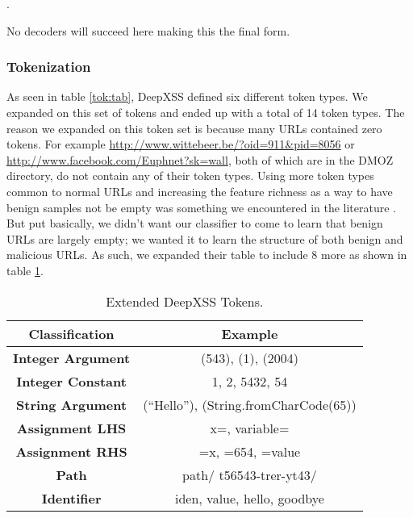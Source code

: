 . 

No decoders will succeed here making this the final form.


\subsubsection{Tokenization}
As seen in table \ref{tok:tab}, DeepXSS defined six different token types. We expanded on this set of tokens and ended up with a total of 14 token types. The reason we expanded on this token set is because many URLs contained zero tokens. For example \url{http://www.wittebeer.be/?oid=911\&pid=8056} or \url{http://www.facebook.com/Euphnet?sk=wall}, both of which are in the DMOZ directory, do not contain any of their token types. Using more token types common to normal URLs and increasing the feature richness as a way to have benign samples not be empty was something we encountered in the literature \cite{mokbal2019mlpxss}\cite{zhang2019cross}. But put basically, we didn't want our classifier to come to learn that benign URLs are largely empty; we wanted it to learn the structure of both benign and malicious URLs. As such, we expanded their table to include 8 more as shown in table \ref{exp:tok:tab}.


\begin{table}
\begin{center}
\begingroup
\setlength{\tabcolsep}{5pt} %
\renewcommand{\arraystretch}{1.5} %
\begin{tabular}{||c | c||} 
    \hline
    Classification & Example \\ [0.5ex] 
    \hline\hline
    \textbf{Integer Argument} &  (543), (1), (2004) \\ 
    \hline
    \textbf{Integer Constant} &  1, 2, 5432, 54 \\ 
    \hline
    \textbf{String Argument} & (``Hello''), (String.fromCharCode(65)) \\
    \hline
    \textbf{Assignment LHS} & x=, variable= \\
    \hline
    \textbf{Assignment RHS} & =x, =654, =value \\
    \hline
    \textbf{Path} & path/ t56543-trer-yt43/ \\ 
    \hline
    \textbf{Identifier} & iden, value, hello, goodbye \\ [1ex] 
    \hline
\end{tabular}
\endgroup
\caption{\label{exp:tok:tab}Extended DeepXSS Tokens.}
\end{center}
\end{table}

